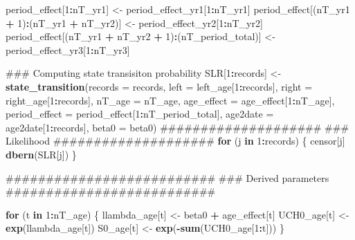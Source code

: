 \documentclass[11pt,]{article}
\newenvironment{Shaded}{\begin{snugshade}}{\end{snugshade}}
\newcommand{\KeywordTok}[1]{\textcolor[rgb]{0.13,0.29,0.53}{\textbf{#1}}}
\newcommand{\DataTypeTok}[1]{\textcolor[rgb]{0.13,0.29,0.53}{#1}}
\newcommand{\DecValTok}[1]{\textcolor[rgb]{0.00,0.00,0.81}{#1}}
\newcommand{\StringTok}[1]{\textcolor[rgb]{0.31,0.60,0.02}{#1}}
\newcommand{\ControlFlowTok}[1]{\textcolor[rgb]{0.13,0.29,0.53}{\textbf{#1}}}
\newcommand{\OperatorTok}[1]{\textcolor[rgb]{0.81,0.36,0.00}{\textbf{#1}}}
\newcommand{\NormalTok}[1]{#1}
\begin{document}
\begin{Shaded}
\begin{Highlighting}[]
\NormalTok{  period_effect[}\DecValTok{1}\OperatorTok{:}\NormalTok{nT_yr1] <-}\StringTok{ }\NormalTok{period_effect_yr1[}\DecValTok{1}\OperatorTok{:}\NormalTok{nT_yr1]}
\NormalTok{  period_effect[(nT_yr1 }\OperatorTok{+}\StringTok{ }\DecValTok{1}\NormalTok{)}\OperatorTok{:}\NormalTok{(nT_yr1 }\OperatorTok{+}\StringTok{ }\NormalTok{nT_yr2)] <-}\StringTok{ }\NormalTok{period_effect_yr2[}\DecValTok{1}\OperatorTok{:}\NormalTok{nT_yr2]}
\NormalTok{  period_effect[(nT_yr1 }\OperatorTok{+}\StringTok{ }\NormalTok{nT_yr2 }\OperatorTok{+}\StringTok{ }\DecValTok{1}\NormalTok{)}\OperatorTok{:}\NormalTok{(nT_period_total)] <-}\StringTok{ }\NormalTok{period_effect_yr3[}\DecValTok{1}\OperatorTok{:}\NormalTok{nT_yr3]}

\NormalTok{  ### Computing state transisiton probability}
\NormalTok{  SLR[}\DecValTok{1}\OperatorTok{:}\NormalTok{records] <-}\StringTok{ }\KeywordTok{state_transition}\NormalTok{(}\DataTypeTok{records =}\NormalTok{ records,}
                                   \DataTypeTok{left =}\NormalTok{ left_age[}\DecValTok{1}\OperatorTok{:}\NormalTok{records],}
                                   \DataTypeTok{right =}\NormalTok{ right_age[}\DecValTok{1}\OperatorTok{:}\NormalTok{records],}
                                   \DataTypeTok{nT_age =}\NormalTok{ nT_age,}
                                   \DataTypeTok{age_effect =}\NormalTok{ age_effect[}\DecValTok{1}\OperatorTok{:}\NormalTok{nT_age],}
                                   \DataTypeTok{period_effect =}\NormalTok{ period_effect[}\DecValTok{1}\OperatorTok{:}\NormalTok{nT_period_total],}
                                   \DataTypeTok{age2date =}\NormalTok{ age2date[}\DecValTok{1}\OperatorTok{:}\NormalTok{records],}
                                   \DataTypeTok{beta0 =}\NormalTok{ beta0)}
\NormalTok{  ####################}
\NormalTok{  ### Likelihood}
\NormalTok{  ####################}
  \ControlFlowTok{for}\NormalTok{ (j }\ControlFlowTok{in} \DecValTok{1}\OperatorTok{:}\NormalTok{records) \{}
\NormalTok{    censor[j] }\OperatorTok{~}\StringTok{ }\KeywordTok{dbern}\NormalTok{(SLR[j])}
\NormalTok{  \}}

\NormalTok{  ##########################}
\NormalTok{  ### Derived parameters}
\NormalTok{  ##########################}

  \ControlFlowTok{for}\NormalTok{ (t }\ControlFlowTok{in} \DecValTok{1}\OperatorTok{:}\NormalTok{nT_age) \{}
\NormalTok{    llambda_age[t] <-}\StringTok{ }\NormalTok{beta0 }\OperatorTok{+}\StringTok{ }\NormalTok{age_effect[t]}
\NormalTok{    UCH0_age[t] <-}\StringTok{ }\KeywordTok{exp}\NormalTok{(llambda_age[t])}
\NormalTok{    S0_age[t] <-}\StringTok{ }\KeywordTok{exp}\NormalTok{(}\OperatorTok{-}\KeywordTok{sum}\NormalTok{(UCH0_age[}\DecValTok{1}\OperatorTok{:}\NormalTok{t]))}
\NormalTok{  \}}


\end{Highlighting}
\end{Shaded}
\end{document}
